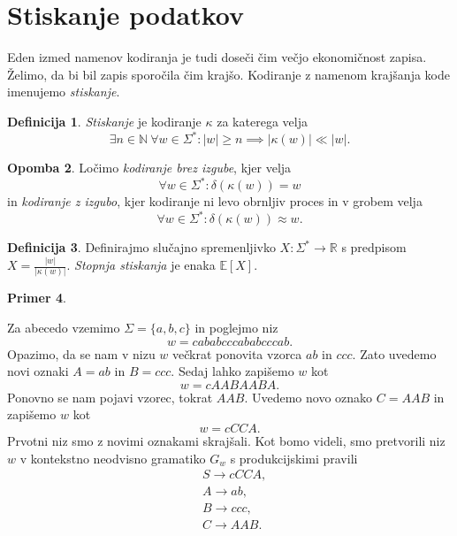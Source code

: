 \documentclass{amsart}
\newcommand{\N}{\mathbb{N}}
\newcommand{\R}{\mathbb{R}}
\theoremstyle{definition}
\newtheorem{definicija}{Definicija}[section]
\newtheorem{primer}[definicija]{Primer}
\newtheorem{opomba}[definicija]{Opomba}
\theoremstyle{plain} %
\begin{document}
\section{Stiskanje podatkov}

Eden izmed namenov kodiranja je tudi doseči čim večjo ekonomičnost zapisa. Želimo, da bi bil zapis
sporočila čim krajšo. Kodiranje z namenom krajšanja kode imenujemo \textit{stiskanje}.

\begin{definicija}
    
    \textit{Stiskanje} je kodiranje $ \kappa $ za katerega velja 
    \[ 
    \exists n \in \N \ \forall w \in \Sigma^* \colon |w| \geq n \implies
    \left\lvert \kappa(w)\right\rvert \ll \left\lvert w \right\rvert.
    \]

\end{definicija}

\begin{opomba}
    
    Ločimo \textit{kodiranje brez izgube}, kjer velja
    \[
        \forall w \in \Sigma^* \colon \delta(\kappa(w)) = w
    \]
    in \textit{kodiranje z izgubo}, kjer kodiranje ni levo obrnljiv proces
    in v grobem velja
    \[
        \forall w \in \Sigma^* \colon \delta(\kappa(w)) \approx w.
    \]

\end{opomba}

\begin{definicija}
    
    Definirajmo slučajno spremenljivko $ X \colon \Sigma^* \to \R $ s predpisom 
    $ X = \frac{|w|}{|\kappa(w)|} $. \textit{Stopnja stiskanja} je enaka $ \mathbb{E}[X] $.

\end{definicija}

\begin{primer}\label{Stiskanje}
    
    Za abecedo vzemimo $ \Sigma = \{ a,b,c \} $ in poglejmo niz
    \[
        w = \mathit{cababcccababcccab}.
    \]
    Opazimo, da se nam v nizu $ w $ večkrat ponovita vzorca $ \mathit{ab} $ in $ \mathit{ccc} $.
    Zato uvedemo novi oznaki $ A = \mathit{ab} $ in $ B = \mathit{ccc} $. Sedaj lahko zapišemo
    $ w $ kot
    \[
        w = \mathit{cAABAABA}.
    \]
    Ponovno se nam pojavi vzorec, tokrat $ \mathit{AAB} $. Uvedemo novo oznako $ C = \mathit{AAB} $
    in zapišemo $ w $ kot
    \[
        w = \mathit{cCCA}.
    \]
    Prvotni niz smo z novimi oznakami skrajšali. Kot bomo videli, smo
    pretvorili niz $ w $ v kontekstno neodvisno gramatiko $ G_w $ s
    produkcijskimi pravili
    \begin{align*}
        & S  \rightarrow  \mathit{cCCA}, \\
        & A  \rightarrow  \mathit{ab}, \\
        & B  \rightarrow  \mathit{ccc}, \\
        & C  \rightarrow  \mathit{AAB}.
    \end{align*}

\end{primer}
\end{document}
